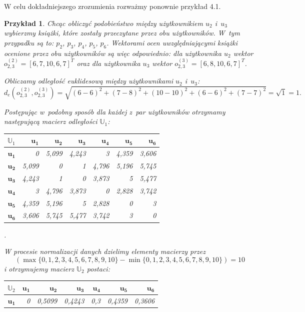 \documentclass[12pt,a4paper]{report}
\newtheorem{przyklad}{Przykład}[chapter]{\normalfont}
\begin{document}
W celu dokładniejszego zrozumienia rozważmy ponownie przykład 4.1.

\begin{przyklad}
Chcąc obliczyć podobieństwo między użytkownikiem $u_2$ i~$u_3$ wybierzmy książki, które zostały przeczytane przez obu użytkowników. W~tym przypadku są to: $p_2$, $p_3$, $p_4$, $p_5$, $p_6$. Wektorami ocen uwzględniającymi książki ocenione przez obu użytkowników są więc odpowiednio: dla użytkownika $u_2$ wektor $o_{2,3} ^{(2)} = [6, 7, 10, 6, 7] ^ T$ oraz dla użytkownika $u_3$ wektor $o_{2,3}^{(3)} = [6, 8, 10, 6, 7] ^ T$.

Obliczamy odległość euklidesową między użytkownikami $u_2$ i~$u_3$: 
$$
d_{e}(o_{2,3}^{(2)},o_{2,3}^{(3)}) = \sqrt{(6-6)^2 + (7-8)^2 + (10-10)^2 + (6-6)^2 + (7-7)^2} = \sqrt{1} = 1.
$$

Postępując w~podobny sposób dla każdej z~par użytkowników otrzymamy następującą macierz odległości $\mathbb{U}_1$:
\begin{center}
\begin{tabular}{|r|r|r|r|r|r|r|} \hline
$\mathbb{U}_1$ & $\mathbf{u_1}$ & $\mathbf{u_2}$ & $\mathbf{u_3}$ & $\mathbf{u_4}$ & $\mathbf{u_5}$ & $\mathbf{u_6}$ \\
\hline
$\mathbf{u_1}$ & 0 & 5,099 & 4,243 & 3 & 4,359 & 3,606 \\
\hline
$\mathbf{u_2}$ & 5,099 & 0 & 1 & 4,796 & 5,196 & 5,745 \\
\hline
$\mathbf{u_3}$ & 4,243 & 1 & 0 & 3,873 & 5 & 5,477 \\
\hline
$\mathbf{u_4}$ & 3 & 4,796 & 3,873 & 0 & 2,828 & 3,742  \\
\hline 
$\mathbf{u_5}$ & 4,359 & 5,196 & 5 & 2,828 & 0 & 3 \\
\hline 
$\mathbf{u_6}$ & 3,606 & 5,745 & 5,477 & 3,742 & 3 & 0  \\
\hline 
\end{tabular}.
\end{center}
W procesie normalizacji danych dzielimy elementy macierzy przez 
$$
(\max\{0,1,2,3,4,5,6,7,8,9,10\} - \min\{0,1,2,3,4,5,6,7,8,9,10\}) = 10
$$ 
i otrzymujemy macierz $\mathbb{U}_2$ postaci:
\begin{center}
\begin{tabular}{|r|r|r|r|r|r|r|} \hline
$\mathbb{U}_2$ & $\mathbf{u_1}$ & $\mathbf{u_2}$ & $\mathbf{u_3}$ & $\mathbf{u_4}$ & $\mathbf{u_5}$ & $\mathbf{u_6}$ \\
\hline
$\mathbf{u_1}$ & 0 & 0,5099 & 0,4243 & 0,3 & 0,4359 & 0,3606 \\

\end{tabular}
\end{center}
\end{przyklad}
\end{document}
